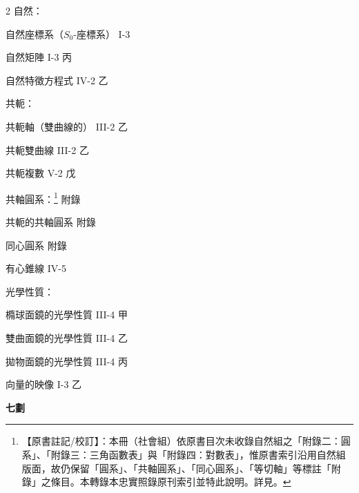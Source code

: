 \begin{multicols}{2}
\noindent 自然：\par
\noindent\hspace*{1.5em} 自然座標系（$S_0$-座標系） \hfill I-3\par
\noindent\hspace*{1.5em} 自然矩陣 \hfill I-3 丙\par
\noindent\hspace*{1.5em} 自然特徵方程式 \hfill IV-2 乙\par
\noindent 共軛：\par
\noindent\hspace*{1.5em} 共軛軸（雙曲線的） \hfill III-2 乙\par
\noindent\hspace*{1.5em} 共軛雙曲線 \hfill III-2 乙\par
\noindent\hspace*{1.5em} 共軛複數 \hfill V-2 戊\par
\noindent 共軸圓系：\label{note:b4s-a2-plate}\footnote{【原書註記/校訂】：本冊（社會組）依原書目次未收錄自然組之「附錄二：圓系」、「附錄三：三角函數表」與「附錄四：對數表」，惟原書索引沿用自然組版面，故仍保留「圓系」、「共軸圓系」、「同心圓系」、「等切軸」等標註「附錄」之條目。本轉錄本忠實照錄原刊索引並特此說明。詳見\errataref。} \hfill 附錄\par
\noindent\hspace*{1.5em} 共軛的共軸圓系 \hfill 附錄\par
\noindent 同心圓系 \hfill 附錄\par
\noindent 有心錐線 \hfill IV-5\par
\noindent 光學性質：\par
\noindent\hspace*{1.5em} 橢球面鏡的光學性質 \hfill III-4 甲\par
\noindent\hspace*{1.5em} 雙曲面鏡的光學性質 \hfill III-4 乙\par
\noindent\hspace*{1.5em} 拋物面鏡的光學性質 \hfill III-4 丙\par
\noindent 向量的映像 \hfill I-3 乙\par

\vspace{0.8em}
\begin{center}
\textbf{\large 七\quad 劃}
\end{center}


\end{multicols}
